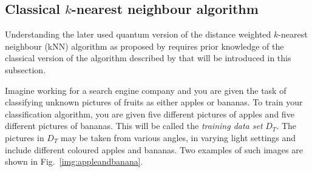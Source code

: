 \newpage
\subsection{Classical $k$-nearest neighbour algorithm}
\label{subsubsec:knearestneighbour}

Understanding the later used quantum version of the distance weighted $k$-nearest neighbour (kNN) algorithm as proposed by  requires prior knowledge of the classical version of the algorithm described by  that will be introduced in this subsection.

Imagine working for a search engine company and you are given the task of classifying unknown pictures of fruits as either apples or bananas. To train your classification algorithm, you are given five different pictures of apples and five different pictures of bananas. This will be called the \emph{training data set} ${D}_{T}$. The pictures in ${D}_{T}$ may be taken from various angles, in varying light settings and include different coloured apples and bananas. Two examples of such images are shown in Fig.~\ref{img:appleandbanana}. 


